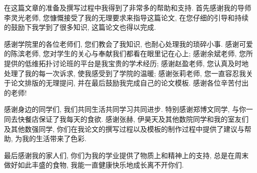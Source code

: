 
\begin{acknowledgements}
  在这篇文章的准备及撰写过程中我得到了非常多的帮助和支持. 首先感谢我的导师李灵光老师, 您慷慨接受了我的无理要求来指导这篇论文, 在您仔细的引导和持续的鼓励下我学到了很多知识, 这篇论文也得以完成.

  感谢学院里的各位老师们, 您们教会了我知识, 也耐心处理我的琐碎小事. 感谢可爱的陈滨老师, 您对学生的关心与奉献我们都看在眼里记在心上; 感谢余斌老师, 您所提供的低维拓扑讨论班的平台是我宝贵的学术经历; 感谢赵盈老师, 您认真及时地处理了我的每一次诉求, 使我感受到了学院的温暖; 感谢张莉老师, 您一直容忍我关于论文排版的无理提问, 并在最后鼓励我完成自己的论文模板. 感谢各位辛苦付出的老师!

  感谢身边的同学们, 我们共同生活共同学习共同进步. 特别感谢郑博文同学, 与你一同去快餐店保证了我每天的食欲. 感谢张赫, 伊昊天及其他数院同学和我的室友们及其他数强同学, 你们在我论文的撰写过程以及模板的制作过程中提供了建议与帮助, 为我的生活带来了色彩.

  最后感谢我的家人们, 你们为我的学业提供了物质上和精神上的支持, 总是在周末做好如此丰盛的食物, 我能一直健康快乐地成长离不开你们.
%
\end{acknowledgements}

